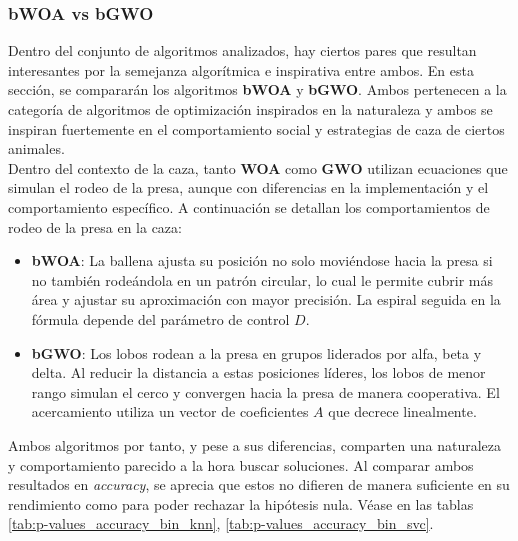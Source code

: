 \subsubsection{bWOA vs bGWO}
Dentro del conjunto de algoritmos analizados, hay ciertos pares que resultan interesantes por la semejanza algorítmica e inspirativa entre ambos. En esta sección, se compararán los algoritmos \textbf{bWOA} y \textbf{bGWO}. Ambos pertenecen a la categoría de algoritmos de optimización inspirados en la naturaleza y ambos se inspiran fuertemente en el comportamiento social y estrategias de caza de ciertos animales.\\[6pt]
Dentro del contexto de la caza, tanto \textbf{WOA} como \textbf{GWO} utilizan ecuaciones que simulan el rodeo de la presa, aunque con diferencias en la implementación y el comportamiento específico. A continuación se detallan los comportamientos de rodeo de la presa en la caza:
\begin{itemize}
    \item \textbf{bWOA}: La ballena ajusta su posición no solo moviéndose hacia la presa si no también rodeándola en un patrón circular, lo cual le permite cubrir más área y ajustar su aproximación con mayor precisión. La espiral seguida en la fórmula depende del parámetro de control $D$.
    \item \textbf{bGWO}: Los lobos rodean a la presa en grupos liderados por alfa, beta y delta. Al reducir la distancia a estas posiciones líderes, los lobos de menor rango simulan el cerco y convergen hacia la presa de manera cooperativa. El acercamiento utiliza un vector de coeficientes $A$ que decrece linealmente.
\end{itemize}

Ambos algoritmos por tanto, y pese a sus diferencias, comparten una naturaleza y comportamiento parecido a la hora buscar soluciones. Al comparar ambos resultados en \textit{accuracy}, se aprecia que estos no difieren de manera suficiente en su rendimiento como para poder rechazar la hipótesis nula. Véase en las tablas \ref{tab:p-values_accuracy_bin_knn}, \ref{tab:p-values_accuracy_bin_svc}.


